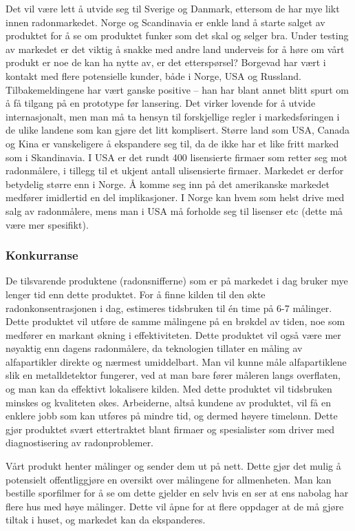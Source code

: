 Det vil være lett å utvide seg til Sverige og Danmark, ettersom de har mye likt innen radonmarkedet. Norge og Scandinavia er enkle land å starte salget av produktet for å se om produktet funker som det skal og selger bra. Under testing av markedet er det viktig å snakke med andre land underveis for å høre om vårt produkt er noe de kan ha nytte av, er det etterspørsel? 
Borgevad har vært i kontakt med flere potensielle kunder, både i Norge, USA og Russland.
Tilbakemeldingene har vært ganske positive – han har blant annet blitt spurt om å få tilgang på en prototype før lansering.
Det virker lovende for å utvide internasjonalt, men man må ta hensyn til forskjellige regler i markedsføringen i de ulike landene som kan gjøre det litt komplisert. 
Større land som USA, Canada og Kina er vanskeligere å ekspandere seg til, da de ikke har et like fritt marked som i Skandinavia.
I USA er det rundt 400 lisensierte firmaer som retter seg mot radonmålere, i tillegg til et ukjent antall ulisensierte firmaer.
Markedet er derfor betydelig større enn i Norge.
Å komme seg inn på det amerikanske markedet medfører imidlertid en del implikasjoner.
I Norge kan hvem som helst drive med salg av radonmålere, mens man i USA må forholde seg til lisenser etc (dette må være mer spesifikt).

\subsubsection{Konkurranse}

De tilsvarende produktene (radonsnifferne) som er på markedet i dag bruker mye lenger tid enn dette produktet. For å finne kilden til den økte radonkonsentrasjonen i dag, estimeres tidsbruken til én time på 6-7 målinger. Dette produktet vil utføre de samme målingene på en brøkdel av tiden, noe som medfører en markant økning i effektiviteten. Dette produktet vil også være mer nøyaktig enn dagens radonmålere, da teknologien tillater en måling av alfapartikler direkte og nærmest umiddelbart. Man vil kunne måle alfapartiklene slik en metalldetektor fungerer, ved at man bare fører måleren langs overflaten, og man kan da effektivt lokalisere kilden. Med dette produktet vil tidsbruken minskes og kvaliteten økes. Arbeiderne, altså kundene av produktet, vil få en enklere jobb som kan utføres på mindre tid, og dermed høyere timelønn. Dette gjør produktet svært ettertraktet blant firmaer og spesialister som driver med diagnostisering av radonproblemer.

Vårt produkt henter målinger og sender dem ut på nett. Dette gjør det mulig å potensielt offentliggjøre en oversikt over målingene for allmenheten. Man kan bestille sporfilmer for å se om dette gjelder en selv hvis en ser at ens nabolag har flere hus med høye målinger. Dette vil åpne for at flere oppdager at de må gjøre tiltak i huset, og markedet kan da ekspanderes.

